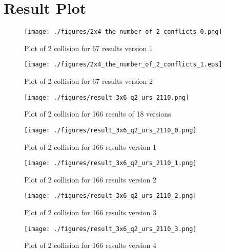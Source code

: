 \chapter{Result Plot} \label{chap:plot}

\begin{figure}[!htb]
    \centering
    \texttt{[image: ./figures/2x4\_the\_number\_of\_2\_conflicts\_0.png]}
    \caption{Plot of 2 collision for 67 results version 1}
    \label{fig:67_v0}
\end{figure}

\begin{figure}[!htb]
    \centering
    \texttt{[image: ./figures/2x4\_the\_number\_of\_2\_conflicts\_1.eps]}
    \caption{Plot of 2 collision for 67 results version 2}
    \label{fig:67_v1}
\end{figure}

\begin{figure}[!htb]
    \centering
    \texttt{[image: ./figures/result\_3x6\_q2\_urs\_2110.png]}
    \caption{Plot of 2 collision for 166 results of 18 versions}
    \label{fig:67_v0}
\end{figure}

\begin{figure}[!htb]
    \centering
    \texttt{[image: ./figures/result\_3x6\_q2\_urs\_2110\_0.png]}
    \caption{Plot of 2 collision for 166 results version 1}
    \label{fig:67_v0}
\end{figure}

\begin{figure}[!htb]
    \centering
    \texttt{[image: ./figures/result\_3x6\_q2\_urs\_2110\_1.png]}
    \caption{Plot of 2 collision for 166 results version 2}
    \label{fig:67_v0}
\end{figure}

\begin{figure}[!htb]
    \centering
    \texttt{[image: ./figures/result\_3x6\_q2\_urs\_2110\_2.png]}
    \caption{Plot of 2 collision for 166 results version 3}
    \label{fig:67_v0}
\end{figure}

\begin{figure}[!htb]
    \centering
    \texttt{[image: ./figures/result\_3x6\_q2\_urs\_2110\_3.png]}
    \caption{Plot of 2 collision for 166 results version 4}
    \label{fig:67_v0}
\end{figure}

